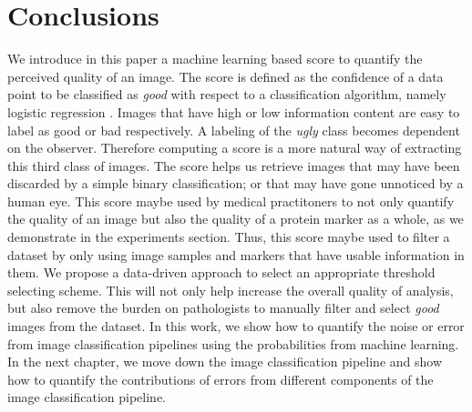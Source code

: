 \section{Conclusions}
We introduce in this paper a machine learning based score to quantify the perceived quality of an image.  The score is defined as the confidence of a data point to be classified as \textit{good} with respect to a classification algorithm, namely logistic regression . Images that have high or low information content are easy to label as good or bad respectively. A labeling of the \textit{ugly} class becomes dependent on the observer. Therefore computing a score is a more natural way of extracting this third class of images. The score helps us retrieve images that may have been discarded by a simple binary classification; or that may have gone unnoticed by a human eye. This score maybe used by medical practitoners to not only quantify the quality of an image but also the quality of a protein marker as a whole, as we demonstrate in the experiments section. Thus, this score maybe used to filter a dataset by only using image samples and markers that have usable information in them. We propose a data-driven approach to select an appropriate threshold selecting scheme. This will not only help increase the overall quality of analysis, but also remove the burden on pathologists to manually filter and select \textit{good} images from the dataset.
In this work, we show how to quantify the noise or error from image classification pipelines using the probabilities from machine learning. In the next chapter, we move down the image classification pipeline and show how to quantify the contributions of errors from different components of the image classification pipeline. 